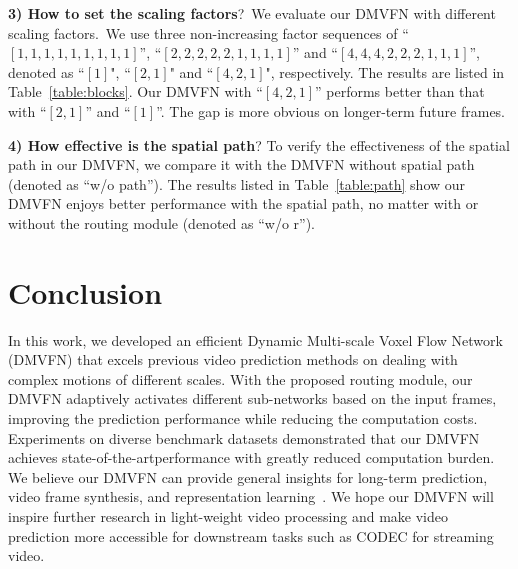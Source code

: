 \documentclass[10pt,twocolumn,letterpaper]{article}
\newcommand{\sota}{state-of-the-art}
\begin{document}
\noindent
\textbf{3) How to set the scaling factors}?\ We evaluate our DMVFN with different scaling factors.\ We use three non-increasing factor sequences of ``$[1,1,1,1,1,1,1,1,1]$'', ``$[2,2,2,2,2,1,1,1,1]$'' and ``$[4,4,4,2,2,2,1,1,1]$'', denoted as ``$[1]$", ``$[2,1]$" and ``$[4,2,1]$", respectively. The results are listed in Table~\ref{table:blocks}. Our DMVFN with ``$[4,2,1]$'' performs better than that with ``$[2,1]$'' and ``$[1]$''. The gap is more obvious on longer-term future frames.

\begin{table}[th]
\caption{\textbf{Spatial path is effective in our DMVFN}. The evaluation metric is MS-SSIM ($\times10^{-2}$).}

\centering
{}
\label{table:path}
\end{table}

\noindent
\textbf{4) How effective is the spatial path}? To verify the effectiveness of the spatial path in our DMVFN, we compare it with the DMVFN without spatial path (denoted as ``w/o path''). The results listed in Table~\ref{table:path} show our DMVFN enjoys better performance with the spatial path, no matter with or without the routing module (denoted as ``w/o r'').

 	\section{Conclusion}
 
In this work, we developed an efficient Dynamic Multi-scale Voxel Flow Network (DMVFN) that excels previous video prediction methods on dealing with complex motions of different scales. With the proposed routing module, our DMVFN adaptively activates different sub-networks based on the input frames, improving the prediction performance while reducing the computation costs. Experiments on diverse benchmark datasets demonstrated that our DMVFN achieves \sota performance with greatly reduced computation burden. We believe our DMVFN can provide general insights for long-term prediction, video frame synthesis, and representation learning~\cite{hafner2023mastering,ha2018world}. We hope our DMVFN will inspire further research in light-weight video processing and make video prediction more accessible for downstream tasks such as CODEC for streaming video.
\end{document}
